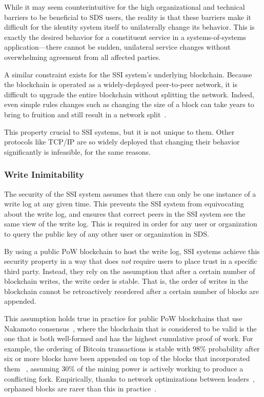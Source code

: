While it may seem counterintuitive for the high organizational and technical
barriers to be beneficial to SDS users, the reality is that these barriers
make it difficult for the identity system itself to unilaterally change its
behavior.  This is exactly the desired behavior for a constituent service in a
systems-of-systems application---there cannot be sudden,
unilateral service changes without overwhelming agreement from all affected parties.

A similar constraint exists for the SSI system's underlying blockchain.
Because the blockchain is operated as a widely-deployed peer-to-peer network,
it is difficult to upgrade the entire blockchain without splitting the network.
Indeed, even simple rules changes such as changing the size of a block can take 
years to bring to fruition and still result in a network
split~\cite{bitcoin-cash-split}.

This property crucial to SSI systems, but it is not unique to them.
Other protocols like TCP/IP are so
widely deployed that changing their behavior significantly is infeasible, for
the same reasons.

\subsubsection{Write Inimitability}

The security of the SSI system assumes that there can only be one instance of a write
log at any given time.  This prevents the SSI system from equivocating about the write log, and
ensures that correct peers in the SSI system see the same view of the write log.  This
is required in order for any user or organization to query the public key of any other 
user or organization in SDS.

By using a public PoW blockchain to host the write log, SSI systems achieve
this security property in a way that does \emph{not} require users to place
trust in a specific third party.  Instead, they rely on the assumption that after a certain number
of blockchain writes, the write order is stable.  That is, the order of writes
in the blockchain cannot be retroactively reordered after a certain number of
blocks are appended.

This assumption holds true in practice for public PoW blockchains that use
Nakamoto consensus~\cite{bitcoin-pedigree}, where the blockchain that is
considered to be valid is the one that is both well-formed and has the highest
cumulative proof of work.  For example, the ordering of Bitcoin transactions
is stable with 98\% probability after six or more blocks have been appended on top of
the blocks that incorporated them
~\cite{bitcoin}, assuming 30\% of the mining power is actively working to
produce a conflicting fork.
Empirically, thanks to network optimizations between leaders~\cite{bitcoin-miner-network},
orphaned blocks are rarer than this in practice~\cite{blockchain-info-orphan-rate}.

